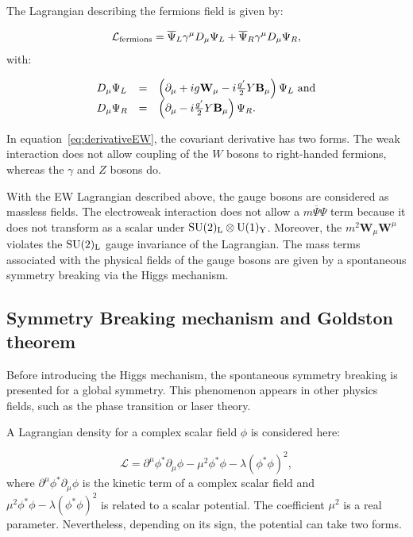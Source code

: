     The Lagrangian describing the fermions field is given by:

    \begin{equation}
      \mathcal{L}_{\rm{fermions}} = \overline{\Psi}_L\gamma^{\mu}D_{\mu}\Psi_L + \overline{\Psi}_R\gamma^{\mu}D_{\mu}\Psi_R,
    \end{equation}
    with:
      
    \begin{equation}
      \begin{array}{lcl}
      D_{\mu}\Psi_L & = & \left( \partial_{\mu} + ig \textbf{W}_{\mu} - i \frac{g'}{2} Y \textbf{B}_{\mu}\right)\Psi_L~\rm{and} \\
      D_{\mu}\Psi_R & = & \left(\partial_{\mu} - i\frac{g'}{2} Y \textbf{B}_{\mu}\right)\Psi_R.
      \end{array}
      \label{eq:derivativeEW}
    \end{equation}
    
    In equation~\ref{eq:derivativeEW}, the covariant derivative has two forms. 
    The weak interaction does not allow coupling of the $W$ bosons to right-handed fermions, whereas the $\gamma$ and $Z$ bosons do.

    With the \gls{EW} Lagrangian described above, the gauge bosons are considered as massless fields.
    The electroweak interaction does not allow a $m\overline{\Psi}\Psi$ term because it does not transform as a scalar under $\rm{SU}(2)_{\rm{L}} \otimes \rm{U}(1)_{\rm{Y}}$.
    Moreover, the $m^2 \textbf{W}_{\mu} \textbf{W}^{\mu}$ violates the $\rm{SU}(2)_{\rm{L}}$ gauge invariance of the Lagrangian.
    The mass terms associated with the physical fields of the gauge bosons are given by a spontaneous symmetry breaking via the Higgs mechanism.

      \subsection{Symmetry Breaking mechanism and Goldston theorem}
    
      Before introducing the Higgs mechanism, the spontaneous symmetry breaking is presented for a global symmetry.
      This phenomenon appears in other physics fields, such as the phase transition or laser theory.

      A Lagrangian density for a complex scalar field $\phi$ is considered here:

      \begin{equation}
        \mathcal{L} = \partial^{\mu}\phi^{*} \partial_{\mu}\phi - \mu^2\phi^{*}\phi - \lambda (\phi^{*}\phi)^2,
        \label{eq:ssbLagrangian}
      \end{equation}
      where $\partial^{\mu}\phi^{*} \partial_{\mu}\phi$ is the kinetic term of a complex scalar field and $\mu^2\phi^{*}\phi - \lambda (\phi^{*}\phi)^2$ is related to a scalar potential.
      The coefficient $\mu^2$ is a real parameter. 
      Nevertheless, depending on its sign, the potential can take two forms.


